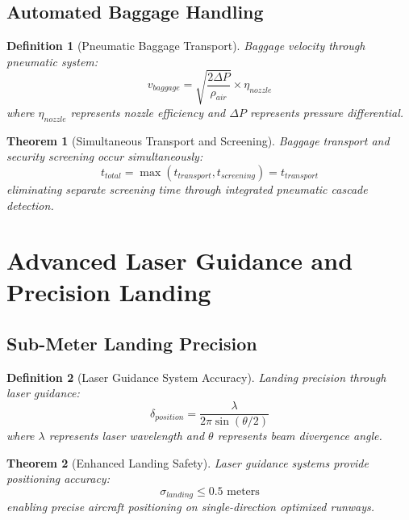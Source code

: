 \documentclass[12pt,a4paper]{article}
\newtheorem{theorem}{Theorem}
\newtheorem{definition}{Definition}
\begin{document}
\subsection{Automated Baggage Handling}

\begin{definition}[Pneumatic Baggage Transport]
Baggage velocity through pneumatic system:
\begin{equation}
v_{baggage} = \sqrt{\frac{2\Delta P}{\rho_{air}}} \times \eta_{nozzle}
\end{equation}
where $\eta_{nozzle}$ represents nozzle efficiency and $\Delta P$ represents pressure differential.
\end{definition}

\begin{theorem}[Simultaneous Transport and Screening]
Baggage transport and security screening occur simultaneously:
\begin{equation}
t_{total} = \max(t_{transport}, t_{screening}) = t_{transport}
\end{equation}
eliminating separate screening time through integrated pneumatic cascade detection.
\end{theorem}

\section{Advanced Laser Guidance and Precision Landing}

\subsection{Sub-Meter Landing Precision}

\begin{definition}[Laser Guidance System Accuracy]
Landing precision through laser guidance:
\begin{equation}
\delta_{position} = \frac{\lambda}{2\pi \sin(\theta/2)}
\end{equation}
where $\lambda$ represents laser wavelength and $\theta$ represents beam divergence angle.
\end{definition}

\begin{theorem}[Enhanced Landing Safety]
Laser guidance systems provide positioning accuracy:
\begin{equation}
\sigma_{landing} \leq 0.5 \text{ meters}
\end{equation}
enabling precise aircraft positioning on single-direction optimized runways.
\end{theorem}
\end{document}
